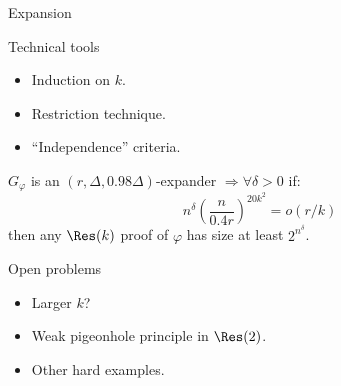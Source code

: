 \begin{frame}{Expansion}

\end{frame}


\begin{frame}{Technical tools}

    \pause
    \begin{itemize}
        \item Induction on $k$.
        \item Restriction technique.
        \item ``Independence'' criteria.
    \end{itemize}

    \pause

    \begin{theorem}
        $G_{\varphi}$ is an $(r, \Delta, 0.98 \Delta)$-expander $\Rightarrow \forall \delta > 0$ if:
        $$
            n^{\delta} \left( \frac{n}{0.4 r} \right)^{20 k^2} = o(r / k)
        $$
        then any $\Res(k)$ proof of $\varphi$ has size at least $2^{n^{\delta}}$.
    \end{theorem}

\end{frame}


\begin{frame}{Open problems}
    \pause
    \begin{itemize}
        \item Larger $k$?
            \pause
        \item Weak pigeonhole principle in $\Res(2)$.
            \pause
        \item Other hard examples.
    \end{itemize}
\end{frame}